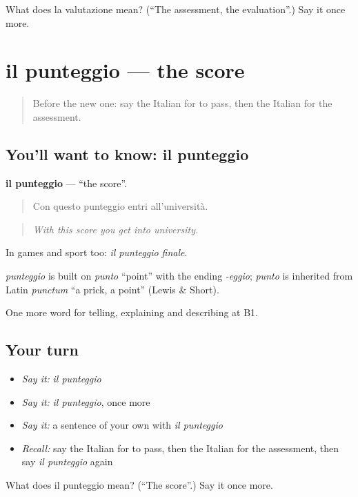 \begin{tcolorbox}[breakable,colback=teal!4,colframe=teal!35!black,title={Before you move on}]
What does la valutazione mean? (\textquotedblleft{}The assessment, the evaluation\textquotedblright{}.) Say it once more.
\end{tcolorbox}
\section[il punteggio]{il punteggio — the score}

\label{lesson:IT-C383-punteggio}



\begin{quote}
Before the new one: say the Italian for to pass, then the Italian for the assessment.
\end{quote}

\subsection*{You'll want to know: il punteggio}
\textbf{il punteggio} — \textquotedblleft{}the score\textquotedblright{}.

\begin{quote}
Con questo punteggio entri all'università.
\end{quote}

\begin{quote}
\emph{With this score you get into university.}
\end{quote}

In games and sport too: \emph{il punteggio finale}.

\begin{cousinweb}
\emph{punteggio} is built on \emph{punto} \textquotedblleft{}point\textquotedblright{} with the ending \emph{-eggio}; \emph{punto} is inherited from Latin \emph{punctum} \textquotedblleft{}a prick, a point\textquotedblright{} (Lewis \& Short).
\end{cousinweb}

\begin{grammarlens}[title={What you've built}]
One more word for telling, explaining and describing at B1.
\end{grammarlens}

\subsection*{Your turn}
\begin{itemize}
\raggedright
  \item \emph{Say it:} \emph{il punteggio}
  \item \emph{Say it:} \emph{il punteggio}, once more
  \item \emph{Say it:} a sentence of your own with \emph{il punteggio}
  \item \emph{Recall:} say the Italian for to pass, then the Italian for the assessment, then say \emph{il punteggio} again
\end{itemize}

\begin{tcolorbox}[breakable,colback=teal!4,colframe=teal!35!black,title={Before you move on}]
What does il punteggio mean? (\textquotedblleft{}The score\textquotedblright{}.) Say it once more.
\end{tcolorbox}
